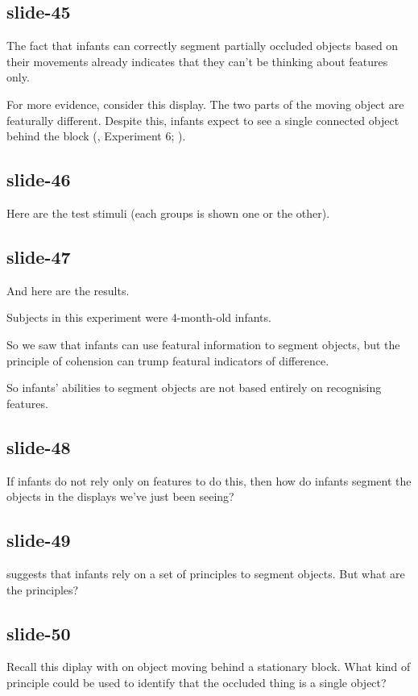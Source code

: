 \documentclass[12pt,\papersize]{extarticle}
\begin{document}
\subsection{slide-45}
The fact that infants can correctly segment partially occluded objects based on their movements 
already indicates that they can't be thinking about features only.
 
For more evidence, consider this display.
The two parts of the moving object are featurally different.
Despite this, infants expect to see a single connected object behind the block 
(\citealp{kellman:1983_perception}, Experiment 6; \citealp{Spelke:1990jn}).
 
\subsection{slide-46}
Here are the test stimuli (each groups is shown one or the other).
 
\subsection{slide-47}
And here are the results.
 
Subjects in this experiment were 4-month-old infants.
 
So we saw that infants can use featural information to segment objects, 
but the principle of cohension can trump featural indicators of difference.
 
So infants' abilities to segment objects are not based entirely on recognising features.
 
\subsection{slide-48}
If infants do not rely only on features to do this, then
how do infants segment the objects in the displays we've just been seeing?
 
\subsection{slide-49}
\citet{Spelke:1990jn} suggests that infants rely on a set of principles to segment objects.
But what are the principles?
 
\subsection{slide-50}
Recall this diplay with on object moving behind a stationary block.
What kind of principle could be used to identify that the occluded thing is a single object?
 
\end{document}

